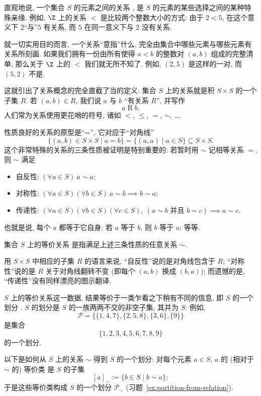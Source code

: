 直观地说, 一个集合 $S$ 的元素之间的关系%
, 是 $S$ 的元素的某些选择之间的某种特殊亲缘. 例如, $\Z$ 上的关系 $<$ 是比较两个整数大小的方式: 由于 $2 < 5$, 在这个意义下 $2$``与''$5$ 有关系, 而 $5$ 在同一意义下与 $2$ 没有关系.

就一切实用目的而言, 一个关系``意指''什么, 完全由集合中哪些元素与哪些元素有关系所刻画. 如果我们拥有一份由所有使得 $a < b$ 的整数对 $(a,b)$ 组成的完整清单, 那么关于 $\Z$ 上的 $<$ 我们就无所不知了. 例如, $(2,5)$ 是这样的一对, 而 $(5,2)$ 不是.

这就引出了关系概念的完全直截了当的定义: 集合 $S$ 上的关系就是积 $S \times S$ 的一个子集 $R$. 若 $(a,b) \in R$, 我们说 $a$ 与 $b$ ``有关系 $R$'', 并写作
\[
a \mathrel{R} b.
\]
人们常为关系使用更花哨的符号, 诸如 $<$, $\leq$, $=$, $\sim$, \ldots.

性质良好的关系的原型是``='', 它对应于``对角线''
\[
\{(a,b) \in S \times S \mid a = b\} = \{(a,a) \mid a \in S\} \subseteq S \times S.
\]
这个非常特殊的关系的三条性质被证明是特别重要的: 若暂时用 $\sim$ 记相等关系 $=$, 则 $\sim$ 满足
\begin{itemize}
	\item 自反性: $(\forall a \in S)\ a \sim a$;
	\item 对称性: $(\forall a \in S) (\forall b \in S)\ a \sim b \implies b \sim a$;
	\item 传递性: $(\forall a \in S) (\forall b \in S) (\forall c \in S),\ (a \sim b \text{ 并且 } b \sim c) \implies a \sim c$.
\end{itemize}
也就是说, 每个 $a$ 都等于它自身; 若 $a$ 等于 $b$, 则 $b$ 等于 $a$; 等等.

\begin{definition}[等价关系]
\label{def:equiv-rel}
集合 $S$ 上的等价关系%
是指满足上述三条性质的任意关系 $\sim$.
\end{definition}

用 $S \times S$ 中相应的子集 $R$ 的语言来说, ``自反性''说的是对角线包含于 $R$; ``对称性''说的是 $R$ 关于对角线翻转不变 (即每个 $(a,b)$ 换成 $(b,a)$); 而遗憾的是, ``传递性''没有同样漂亮的图示翻译.

$S$ 上的等价关系这一数据, 结果等价于一类乍看之下稍有不同的信息, 即 $S$ 的一个划分%
. $S$ 的划分是 $S$ 的一族两两不交的非空子集, 其并为 $S$: 例如,
\[
\mathscr{P} = \{\{1,4,7\}, \{2,5,8\}, \{3,6\}, \{9\}\}
\]
是集合
\[
\{1,2,3,4,5,6,7,8,9\}
\]
的一个划分.

以下是如何从 $S$ 上的关系 $\sim$ 得到 $S$ 的一个划分: 对每个元素 $a \in S$, $a$ 的 (相对于 $\sim$ 的) 等价类%
是 $S$ 的子集
\[
[a]_{\sim} := \{b \in S \mid b \sim a\};
\]
于是这些等价类构成 $S$ 的一个划分 $\mathscr{P}_{\sim}$ (习题~\ref{ex:partition-from-relation}).

